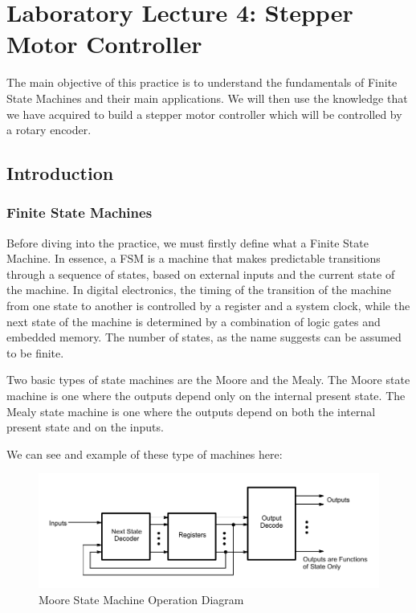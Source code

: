 \section{Laboratory Lecture 4: Stepper Motor Controller}

The main objective of this practice is to understand the fundamentals of Finite State Machines and their main applications. We will then use the knowledge that we have acquired to build a stepper motor controller which will be controlled by a rotary encoder.

\subsection{Introduction}

\subsubsection{Finite State Machines}

Before diving into the practice, we must firstly define what a Finite State Machine. In essence, a FSM is a machine that makes predictable transitions through a sequence of states, based on external inputs and the current state of the machine. In digital electronics, the timing of the transition of the machine from one state to another is controlled by a register and a system clock, while the next state of the machine is determined by a combination of logic gates and embedded memory. The number of states, as the name suggests can be assumed to be finite. ~\autocite{FSM} \medskip

Two basic types of state machines are the Moore and the Mealy. The Moore state machine is one where the outputs depend only on the internal present state. The Mealy state machine is one where the outputs depend on both the internal present state and on the inputs. ~\autocite{FLOYD} \medskip

We can see and example of these type of machines here:


\begin{figure}[H]
    \centering
    \includegraphics[width = \textwidth]{Graphics/VHDL/Practice 4/MOORE.pdf}
    \caption{Moore State Machine Operation Diagram ~\autocite{AMD}}
    \label{fig:MOORE}
\end{figure}

